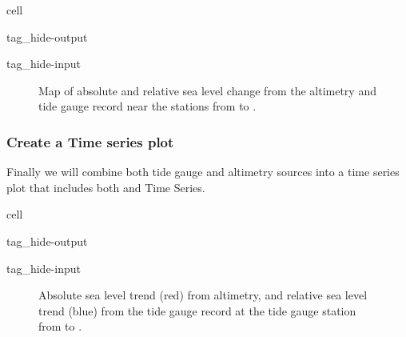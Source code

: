 \documentclass[letterpaper,10pt,english]{jupyterBook}
\begin{document}
\begin{sphinxuseclass}{cell}
\begin{sphinxuseclass}{tag_hide-output}
\begin{sphinxuseclass}{tag_hide-input}
\end{sphinxuseclass}
\end{sphinxuseclass}
\end{sphinxuseclass}
\begin{figure}[htbp]
\centering
\capstart

\noindent{}
\caption{Map of absolute and relative sea level change from the altimetry and tide gauge record near the  stations from  to .}\label{\detokenize{notebooks/regional_and_local/SL_Trend:fig-mag}}
\begin{sphinxlegend}
\sphinxAtStartPar
{}
\end{sphinxlegend}
\end{figure}


\subsubsection{Create a Time series plot}
\label{\detokenize{notebooks/regional_and_local/SL_Trend:create-a-time-series-plot}}\label{\detokenize{notebooks/regional_and_local/SL_Trend:id5}}
\sphinxAtStartPar
Finally we will combine both tide gauge and altimetry sources into a time series plot that includes both {\hyperref[\detokenize{notebooks/regional_and_local/SL_Trend:asltimeseries}]{}}  and {\hyperref[\detokenize{notebooks/regional_and_local/SL_Trend:rsltimeseries}]{}} Time Series.

\begin{sphinxuseclass}{cell}
\begin{sphinxuseclass}{tag_hide-output}
\begin{sphinxuseclass}{tag_hide-input}
\end{sphinxuseclass}
\end{sphinxuseclass}
\end{sphinxuseclass}
\begin{figure}[htbp]
\centering
\capstart

\noindent{}
\caption{Absolute sea level trend (red) from altimetry, and relative sea level trend (blue) from the tide gauge record at the  tide gauge station from  to .}\label{\detokenize{notebooks/regional_and_local/SL_Trend:trend-fig-station}}\end{figure}
\end{document}
